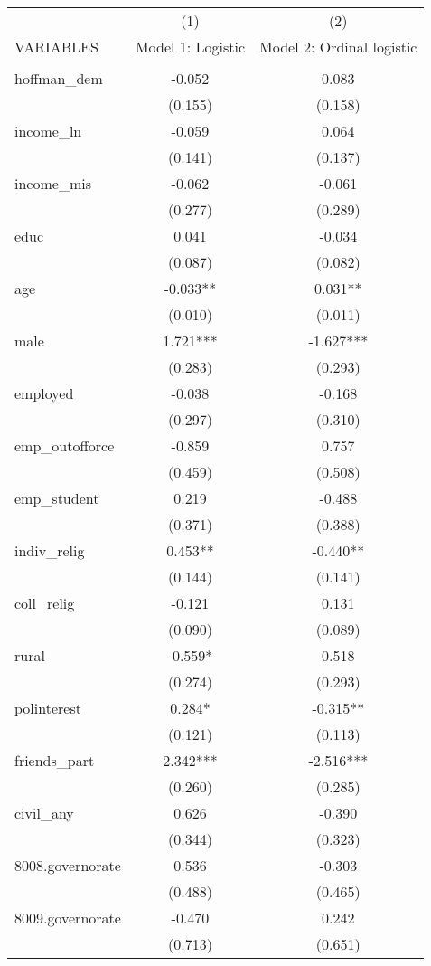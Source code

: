 \documentclass[]{article}
\begin{document}
\begin{tabular}{lcc} \hline
 & (1) & (2) \\
VARIABLES & Model 1: Logistic & Model 2: Ordinal logistic \\ \hline
 &  &  \\
hoffman\_dem & -0.052 & 0.083 \\
 & (0.155) & (0.158) \\
income\_ln & -0.059 & 0.064 \\
 & (0.141) & (0.137) \\
income\_mis & -0.062 & -0.061 \\
 & (0.277) & (0.289) \\
educ & 0.041 & -0.034 \\
 & (0.087) & (0.082) \\
age & -0.033** & 0.031** \\
 & (0.010) & (0.011) \\
male & 1.721*** & -1.627*** \\
 & (0.283) & (0.293) \\
employed & -0.038 & -0.168 \\
 & (0.297) & (0.310) \\
emp\_outofforce & -0.859 & 0.757 \\
 & (0.459) & (0.508) \\
emp\_student & 0.219 & -0.488 \\
 & (0.371) & (0.388) \\
indiv\_relig & 0.453** & -0.440** \\
 & (0.144) & (0.141) \\
coll\_relig & -0.121 & 0.131 \\
 & (0.090) & (0.089) \\
rural & -0.559* & 0.518 \\
 & (0.274) & (0.293) \\
polinterest & 0.284* & -0.315** \\
 & (0.121) & (0.113) \\
friends\_part & 2.342*** & -2.516*** \\
 & (0.260) & (0.285) \\
civil\_any & 0.626 & -0.390 \\
 & (0.344) & (0.323) \\
8008.governorate & 0.536 & -0.303 \\
 & (0.488) & (0.465) \\
8009.governorate & -0.470 & 0.242 \\
 & (0.713) & (0.651) \\

\end{tabular}
\end{document}
